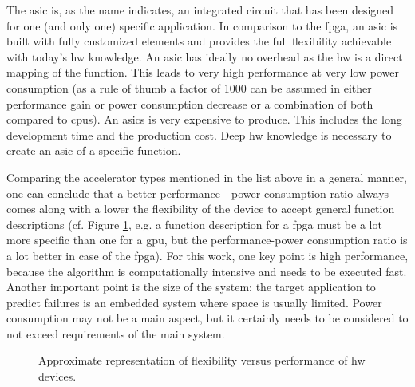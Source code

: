 \documentclass[mscthesis]{usiinfthesis}
\begin{document}
\begin{description}
        The \acrfull{asic} is, as the name indicates, an integrated circuit
        that has been designed for one (and only one) specific application. In
        comparison to the \gls{fpga}, an \gls{asic} is built with fully
        customized elements and provides the full flexibility achievable with
        today's \gls{hw} knowledge. An \gls{asic} has ideally no overhead as the
        \gls{hw} is a direct mapping of the function. This leads to very high
        performance at very low power consumption (as a rule of thumb a factor
        of 1000 can be assumed in either performance gain or power consumption
        decrease or a combination of both compared to \glspl{cpu}).  An
        \glspl{asic} is very expensive to produce. This includes the long
        development time and the production cost. Deep \gls{hw} knowledge is
        necessary to create an \gls{asic} of a specific function.
\end{description}

Comparing the accelerator types mentioned in the list above in a general
manner, one can conclude that a better performance - power consumption ratio
always comes along with a lower the flexibility of the device to accept general
function descriptions (cf. Figure \ref{fig:hw}, e.g. a function description
for a \gls{fpga} must be a lot more specific than one for a \gls{gpu}, but the
performance-power consumption ratio is a lot better in case of the \gls{fpga}).
For this work, one key point is high performance, because the algorithm is
computationally intensive and needs to be executed fast. Another important
point is the size of the system: the target application to predict failures is
an embedded system where space is usually limited.  Power consumption may not
be a main aspect, but it certainly needs to be considered to not exceed
requirements of the main system.

\begin{figure}
    \centering
    
    \caption{Approximate representation of flexibility versus performance of
        \acrshort{hw} devices.}
    \label{fig:hw}
\end{figure}
\end{document}
